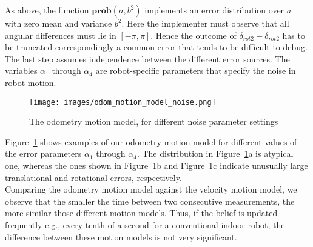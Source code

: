 As above, the function $\mathbf{prob}(a,b^2)$ implements an error distribution over $a$ with zero mean and variance $b^2$.
Here the implementer must observe that all angular differences must lie in $[-\pi, \pi]$.
Hence the outcome of $\delta_{rot2} - \bar{\delta}_{rot2}$ has to be truncated correspondingly a common error that tends to be difficult to debug.
The last step assumes independence between the different error sources. The variables $\alpha_1$ through $\alpha_4$ are robot-specific parameters that specify the noise in robot motion.

\begin{figure}[H]
  \begin{center}
    \texttt{[image: images/odom\_motion\_model\_noise.png]}
  \end{center}
  \caption{The odometry motion model, for different noise parameter settings}
  \label{fig:odom_motion_model_noise}
\end{figure}

Figure~\ref{fig:odom_motion_model_noise} shows examples of our odometry motion model for different values of the error parameters $\alpha_1$ through $\alpha_4$.
The distribution in Figure~\ref{fig:odom_motion_model_noise}a is atypical one, whereas the ones shown in Figure~\ref{fig:odom_motion_model_noise}b and Figure~\ref{fig:odom_motion_model_noise}c indicate unusually large translational and rotational errors, respectively.\\

Comparing the odometry motion model against the velocity motion model, we observe that the smaller the time between two consecutive measurements, the more similar those different motion models. Thus, if the belief is updated
frequently e.g., every tenth of a second for a conventional indoor robot, the difference between these motion models is not very significant.


